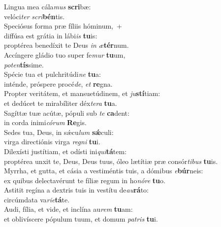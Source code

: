 \evenverse Lingua mea cála\textit{mus} \textbf{scri}bæ:~\*\\
\evenverse velóci\textit{ter} \textit{scri}\textbf{bén}tis.\\
\oddverse Speciósus forma præ fíliis hóminum,~+\\
\oddverse  diffúsa est grátia in lábi\textit{is} \textbf{tu}is:~\*\\
\oddverse proptérea benedíxit te Deus \textit{in} \textit{æ}\textbf{tér}num.\\
\evenverse Accíngere gládio tuo super fe\textit{mur} \textbf{tu}um,~\*\\
\evenverse \textit{po}\textit{ten}\textbf{tís}sime.\\
\oddverse Spécie tua et pulchritúdi\textit{ne} \textbf{tu}a:~\*\\
\oddverse inténde, próspere procé\textit{de}, \textit{et} \textbf{re}gna.\\
\evenverse Propter veritátem, et mansuetúdinem, et \textit{ju}\textbf{stí}tiam:~\*\\
\evenverse et dedúcet te mirabíliter déx\textit{te}\textit{ra} \textbf{tu}a.\\
\oddverse Sagíttæ tuæ acútæ, pópuli sub \textit{te} \textbf{ca}dent:~\*\\
\oddverse in corda inimi\textit{có}\textit{rum} \textbf{Re}gis.\\
\evenverse Sedes tua, Deus, in sǽcu\textit{lum} \textbf{sǽ}culi:~\*\\
\evenverse virga directiónis virga \textit{re}\textit{gni} \textbf{tu}i.\\
\oddverse Dilexísti justítiam, et odísti ini\textit{qui}\textbf{tá}tem:~\*\\
\oddverse proptérea unxit te, Deus, Deus tuus, óleo lætítiæ præ consór\textit{ti}\textit{bus} \textbf{tu}is.\\
\evenverse Myrrha, et gutta, et cásia a vestiméntis tuis, a dómibus \textit{e}\textbf{búr}neis:~\*\\
\evenverse ex quibus delectavérunt te fíliæ regum in ho\textit{nó}\textit{re} \textbf{tu}o.\\
\oddverse Astitit regína a dextris tuis in vestítu de\textit{au}\textbf{rá}to:~\*\\
\oddverse circúmdata va\textit{ri}\textit{e}\textbf{tá}te.\\
\evenverse Audi, fília, et vide, et inclína au\textit{rem} \textbf{tu}am:~\*\\
\evenverse et oblivíscere pópulum tuum, et domum \textit{pa}\textit{tris} \textbf{tu}i.\\
